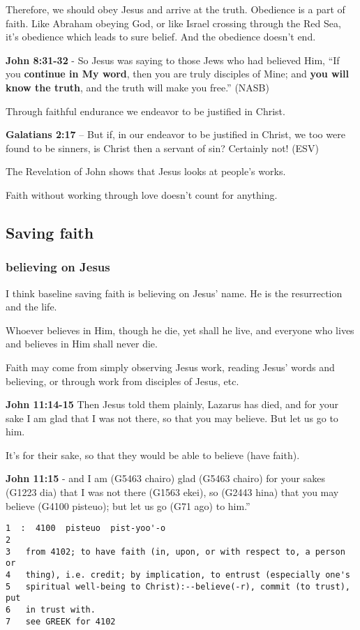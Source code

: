 \documentclass[11pt]{article}
\begin{document}
Therefore, we should obey Jesus and arrive at the truth. Obedience is a part of faith. Like Abraham obeying God, or like Israel crossing through the Red Sea, it's obedience which leads to sure belief.
And the obedience doesn't end.

\textbf{John 8:31-32} - So Jesus was saying to those Jews who had believed Him, “If you \textbf{continue in My word}, then you are truly disciples of Mine; and \textbf{you will know the truth}, and the truth will make you free.” (NASB)

Through faithful endurance we endeavor to be justified in Christ.

\textbf{Galatians 2:17} -- But if, in our endeavor to be justified in Christ, we too were found to be sinners, is Christ then a servant of sin? Certainly not! (ESV)

The Revelation of John shows that Jesus looks at people's works.

Faith without working through love doesn't count for anything.

\subsection{Saving faith}
\label{sec:org865d2df}
\subsubsection{believing on Jesus}
\label{sec:orgb3a9857}
I think baseline saving faith is believing on Jesus' name. He is the resurrection and the life.

Whoever believes in Him, though he die, yet shall he live, and everyone who lives and believes in Him shall never die.

Faith may come from simply observing Jesus work, reading Jesus' words and believing, or through work from disciples of Jesus, etc.

\textbf{John 11:14-15} Then Jesus told them plainly, Lazarus has died, and for your sake I am glad that I was not there, so that you may believe. But let us go to him.

It's for their sake, so that they would be able to believe (have faith).

\textbf{John 11:15} - and I am (G5463 chairo) glad (G5463 chairo) for your sakes (G1223 dia) that I was not there (G1563 ekei), so (G2443 hina) that you may believe (G4100 pisteuo); but let us go (G71 ago) to him.”

\begin{verbatim}
1  :  4100  pisteuo  pist-yoo'-o
2  
3   from 4102; to have faith (in, upon, or with respect to, a person or
4   thing), i.e. credit; by implication, to entrust (especially one's
5   spiritual well-being to Christ):--believe(-r), commit (to trust), put
6   in trust with.
7   see GREEK for 4102
\end{verbatim}
\end{document}
